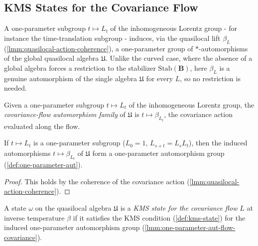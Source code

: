 \subsection{KMS States for the Covariance Flow}

A one-parameter subgroup $t \mapsto L_t$ of the inhomogeneous Lorentz group - for instance the time-translation subgroup - induces, via the quasilocal lift $\beta_L$ (\ref{lmm:quasilocal-action-coherence}), a one-parameter group of $*$-automorphisms of the global quasilocal algebra $\mathfrak{U}$. Unlike the curved case, where the absence of a global algebra forces a restriction to the stabilizer $\mathrm{Stab}(\mathbf{B})$, here $\beta_L$ is a genuine automorphism of the single algebra $\mathfrak{U}$ for every $L$, so no restriction is needed.

\begin{definition}
    \label{def:flow-aut-covariance}
    \leanok
    Given a one-parameter subgroup $t \mapsto L_t$ of the inhomogeneous Lorentz group, the \emph{covariance-flow automorphism family} of $\mathfrak{U}$ is $t \mapsto \beta_{L_t}$, the covariance action evaluated along the flow.
\end{definition}

\begin{lemma}
    \label{lmm:one-parameter-aut-flow-covariance}
    \leanok
    If $t \mapsto L_t$ is a one-parameter subgroup ($L_0 = 1$, $L_{s+t} = L_s L_t$), then the induced automorphisms $t \mapsto \beta_{L_t}$ of $\mathfrak{U}$ form a one-parameter automorphism group (\ref{def:one-parameter-aut}).
\end{lemma}
\begin{proof}
    \leanok
    This holds by the coherence of the covariance action (\ref{lmm:quasilocal-action-coherence}).
\end{proof}

\begin{definition}
    \label{def:kms-state-for-flow-covariance}
    \leanok
    A state $\omega$ on the quasilocal algebra $\mathfrak{U}$ is a \emph{KMS state for the covariance flow} $L$ at inverse temperature $\beta$ if it satisfies the KMS condition (\ref{def:kms-state}) for the induced one-parameter automorphism group (\ref{lmm:one-parameter-aut-flow-covariance}).
\end{definition}

